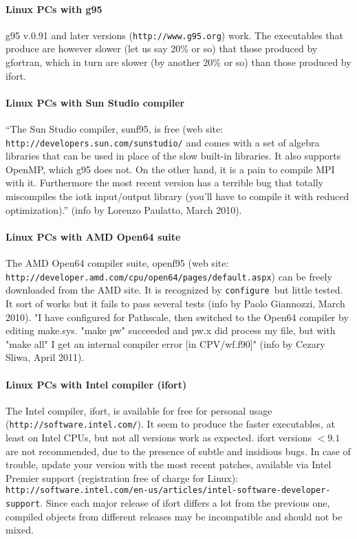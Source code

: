 \documentclass[12pt,a4paper]{article}
\def\configure{\texttt{configure}}
\begin{document}
\paragraph{Linux PCs with g95}

g95 v.0.91 and later versions (\texttt{http://www.g95.org}) work. 
The executables that produce are however slower (let us say 20\% or so) 
that those produced by gfortran, which in turn are slower 
(by another 20\% or so) than those produced by ifort.

\paragraph{Linux PCs with Sun Studio compiler}

``The Sun Studio compiler, sunf95, is free (web site:
\texttt{http://developers.sun.com/sunstudio/} and comes  
with a set of algebra libraries that can be used in place of the slow 
built-in libraries. It also supports OpenMP, which g95 does not. On the 
other hand, it is a pain to compile MPI with it. Furthermore the most
recent version has a terrible bug that totally miscompiles the iotk 
input/output library (you'll have to compile it with reduced optimization).''
(info by Lorenzo Paulatto, March 2010).

\paragraph{Linux PCs with AMD Open64 suite}

The AMD Open64 compiler suite, openf95 (web site:
\texttt{http://developer.amd.com/cpu/open64/pages/default.aspx})
can be freely downloaded from the AMD site.
It is recognized by \configure\ but little tested. It sort of works 
but it fails to pass several tests (info by Paolo Giannozzi, March 2010).
"I have configured for Pathscale, then switched to the Open64 compiler by 
editing make.sys. "make pw" succeeded and pw.x did process my file, but with 
"make all" I get an internal compiler error [in CPV/wf.f90]" (info by Cezary 
Sliwa, April 2011).

\paragraph{Linux PCs with Intel compiler (ifort)}

The Intel compiler, ifort, is available for free for personal 
usage (\texttt{http://software.intel.com/}). It seem to produce the faster executables, 
at least on Intel CPUs, but not all versions work as expected.
ifort versions $<9.1$ are not recommended, due to the presence of subtle 
and insidious bugs. In case of trouble, update your version with 
the most recent patches,
available via Intel Premier support (registration free of charge for Linux):
\texttt{http://software.intel.com/en-us/articles/intel-software-developer-support}.
Since each major release of ifort
differs a lot from the previous one, compiled objects from different 
releases may be incompatible and should not be mixed.    
\end{document}
